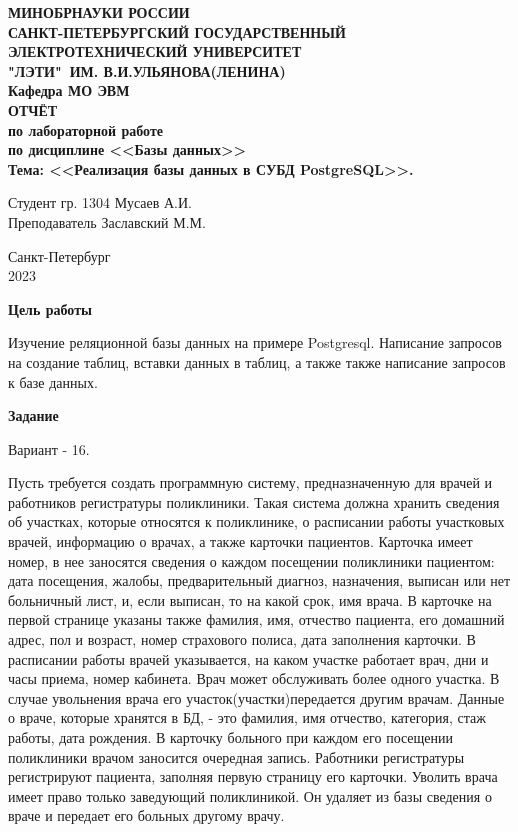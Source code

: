 \documentclass{article}
\date{\today}
\begin{document}
\thispagestyle{empty}
\begin{center}
    \LARGE\textbf{МИНОБРНАУКИ РОССИИ\\
        САНКТ-ПЕТЕРБУРГСКИЙ ГОСУДАРСТВЕННЫЙ\\
        ЭЛЕКТРОТЕХНИЧЕСКИЙ УНИВЕРСИТЕТ\\
        "ЛЭТИ"\ ИМ. В.И.УЛЬЯНОВА(ЛЕНИНА)\\
        Кафедра МО ЭВМ}\\[4cm]
    \Large\textbf{ОТЧЁТ}\\[0.2cm]
    \Large\textbf{по лабораторной работе}\\[0.1cm]
    \Large\textbf{по дисциплине <<Базы данных>>}\\[0.1cm]
    \Large\textbf{Тема: <<Реализация базы данных в СУБД PostgreSQL>>.}\\[3cm]
\end{center}
\Large{Студент гр. 1304 \qquad \qquad \quad \underline{\hspace{6cm}} \qquad \qquad Мусаев А.И.}\\[0.5cm]
\Large{Преподаватель \qquad \qquad \qquad \underline{\hspace{6cm}} \qquad \qquad Заславский М.М.}\\[3.5cm]
\begin{center}
    Санкт-Петербург\\
    2023
\end{center}
\newpage

\textbf{Цель работы}

Изучение реляционной базы данных на примере Postgresql. Написание запросов на создание таблиц, вставки данных в таблиц, а также также написание запросов к базе данных. 

\textbf{Задание}

Вариант - 16.

Пусть требуется создать программную систему, предназначенную для врачей и работников регистратуры поликлиники. Такая система должна хранить сведения об участках, которые относятся к поликлинике, о расписании работы участковых врачей, информацию о врачах, а также карточки пациентов. Карточка имеет номер, в нее заносятся сведения о каждом посещении поликлиники пациентом: дата посещения, жалобы, предварительный диагноз, назначения, выписан или нет больничный лист, и, если выписан, то на какой срок, имя врача. В карточке на первой странице указаны также фамилия, имя, отчество пациента, его домашний адрес, пол и возраст, номер страхового полиса, дата заполнения карточки. В расписании работы врачей указывается, на каком участке работает врач, дни и часы приема, номер кабинета. Врач может обслуживать более одного участка. В случае увольнения врача его участок(участки)передается другим врачам. Данные о враче, которые хранятся в БД, - это фамилия, имя отчество, категория, стаж работы, дата рождения. В карточку больного при каждом его посещении поликлиники врачом заносится очередная запись. Работники регистратуры регистрируют пациента, заполняя первую страницу его карточки. Уволить врача имеет право только заведующий поликлиникой. Он удаляет из базы сведения о враче и передает его больных другому врачу.
\end{document}
